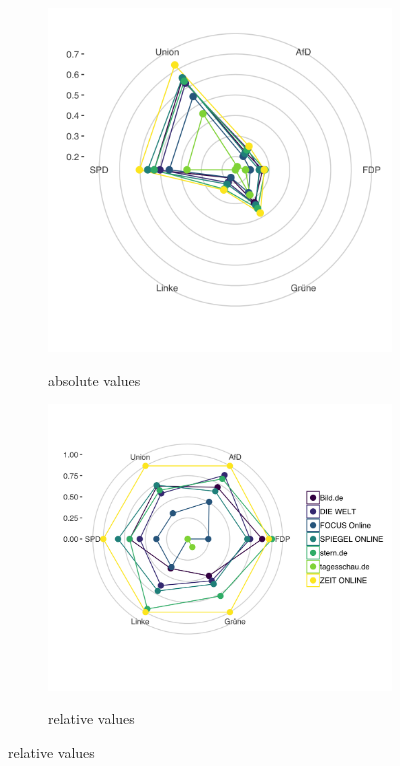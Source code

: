 \documentclass[12pt,a4paper,notitlepage]{article}
\begin{document}
\begin{figure}[H]
	\begin{center}
	\caption{Visibility}
		\begin{subfigure}[normla]{0.42\textwidth}
			\caption{absolute values}
			\includegraphics[width=\textwidth]{../figs/radar_vis}
			\label{fig_vis_absolute}
		\end{subfigure}
		\begin{subfigure}[normla]{0.52\textwidth}
			\caption{relative values}
			\includegraphics[width=\textwidth]{../figs/radar_vis_rescaled}
			\label{fig_vis_relative}
		\end{subfigure}
	\end{center}
\end{figure}
\end{document}
